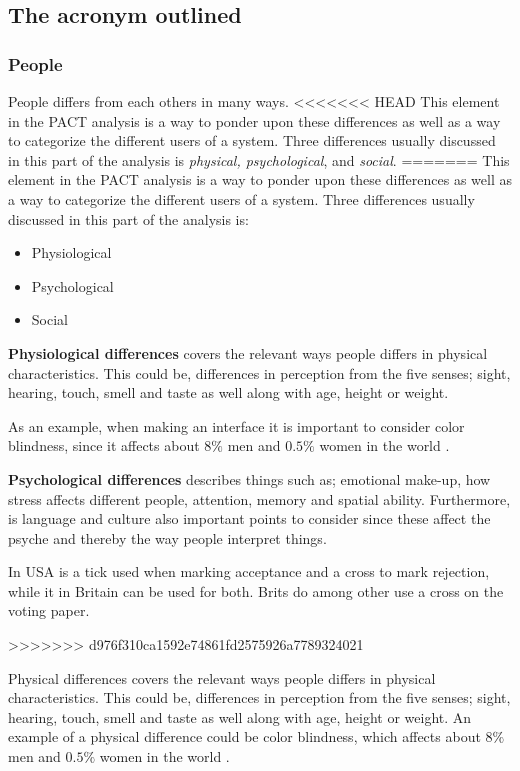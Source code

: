 \subsection{The acronym outlined}\label{sec:PACT-method}
\subsubsection{People}
People differs from each others in many ways.
<<<<<<< HEAD
This element in the PACT analysis is a way to ponder upon these differences as well as a way to categorize the different users of a system. 
Three differences usually discussed in this part of the analysis is \textit{physical, psychological}, and \textit{social}.
=======
This element in the PACT analysis is a way to ponder upon these differences as well as a way to categorize the different users of a system.
Three differences usually discussed in this part of the analysis is:
\begin{itemize}
	\item Physiological
	\item Psychological
	\item Social
\end{itemize}

\textbf{Physiological differences} covers the relevant ways people differs in physical characteristics.
This could be, differences in perception from the five senses; sight, hearing, touch, smell and taste as well along with age, height or weight.
\begin{example}
As an example, when making an interface it is important to consider color blindness, since it affects about $8\%$ men and $0.5\%$ women in the world \cite{ColourBlind}.
\end{example}

\textbf{Psychological differences} describes things such as; emotional make-up, how stress affects different people, attention, memory and spatial ability.
Furthermore, is language and culture also important points to consider since these affect the psyche and thereby the way people interpret things.
\begin{example}
	In USA is a tick used when marking acceptance and a cross to mark rejection, while it in Britain can be used for both. Brits do among other use a cross on the voting paper.
\end{example}
>>>>>>> d976f310ca1592e74861fd2575926a7789324021

Physical differences covers the relevant ways people differs in physical characteristics.
This could be, differences in perception from the five senses; sight, hearing, touch, smell and taste as well along with age, height or weight. An example of a physical difference could be color blindness, which affects about $8\%$ men and $0.5\%$ women in the world \cite{ColourBlind}.

